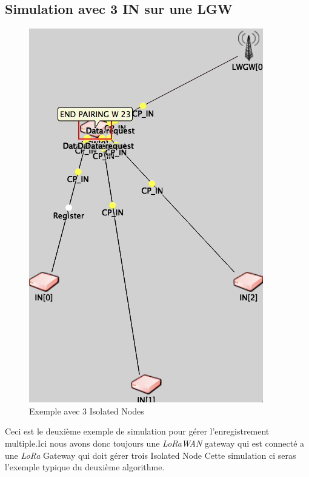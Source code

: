 \subsection{Simulation avec 3 IN sur une LGW}
\begin{figure}[!ht]
\centering
\includegraphics[scale=0.6]{3IN.png} 
\caption{Exemple avec 3 Isolated Nodes}
\end{figure}
Ceci est le deuxième exemple de simulation pour gérer l'enregistrement multiple.Ici nous avons donc toujours une  \textit{LoRaWAN} gateway qui est connecté a une \textit{LoRa} Gateway qui doit gérer trois Isolated Node Cette simulation ci seras l'exemple typique du deuxième algorithme.
\newpage
